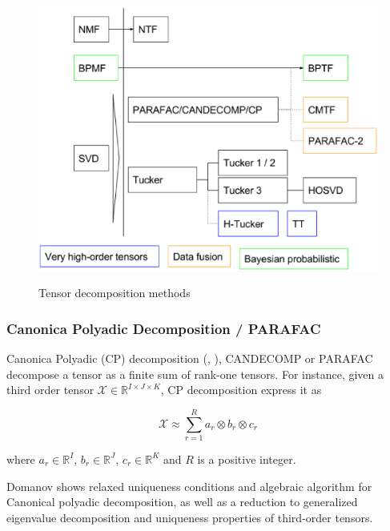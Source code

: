 \documentclass[letterpaper,12pt]{article}
\begin{document}
\begin{figure}[!ht]
\centering
 \includegraphics[scale=0.5]{Images/tensor_decomposition_methods2.eps}\label{fig:methods}
 \caption{Tensor decomposition methods}
\end{figure}

\subsubsection{Canonica Polyadic Decomposition / PARAFAC}

Canonica Polyadic (CP) decomposition (\cite{Kolda2009}, \cite{Mocks1988}), CANDECOMP \cite{Carroll1970} or PARAFAC \cite{Harshman1970} decompose a tensor as a finite sum of rank-one tensors. For instance, given a third order tensor $\mathcal{X}\in\mathbb{R}^{I\times J\times K}$, CP decomposition express it as 

\begin{equation}
 \mathcal{X}\approx \sum_{r=1}^{R}a_r\otimes b_r \otimes c_r
\end{equation}\label{eq:cp}

where $a_r\in\mathbb{R}^I$, $b_r\in\mathbb{R}^J$, $c_r\in\mathbb{R}^K$ and $R$ is a positive integer.



Domanov \cite{Domanov2015} shows relaxed uniqueness conditions and algebraic algorithm for Canonical polyadic decomposition, as well as a reduction to generalized eigenvalue decomposition \cite{Domanov2014} and uniqueness properties \cite{Domanov2013} of third-order tensors.
\end{document}
